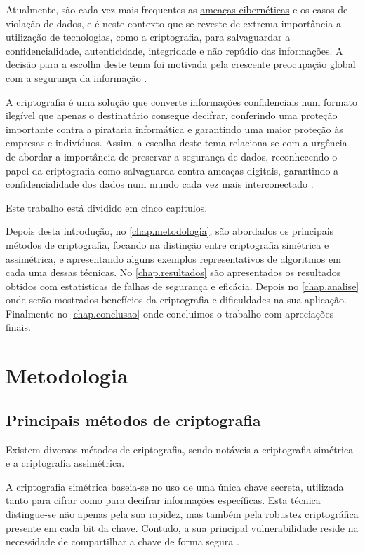 \documentclass{report}
\begin{document}
Atualmente, são cada vez mais frequentes as \underline{ameaças cibernéticas} e os casos de violação de dados, e é neste contexto que se reveste de extrema importância a utilização de tecnologias, como a criptografia, para salvaguardar a confidencialidade, autenticidade, integridade e não repúdio das informações. A decisão para a escolha deste tema foi motivada pela crescente preocupação global com a segurança da informação \cite{Patil.16, Gencoglu.19}. 

A criptografia é uma solução que converte informações confidenciais num formato ilegível que apenas o destinatário consegue decifrar, conferindo uma proteção importante contra a pirataria informática e garantindo uma maior proteção às empresas e indivíduos. Assim, a escolha deste tema relaciona-se com a urgência de abordar a importância de preservar a segurança de dados, reconhecendo o papel da criptografia como salvaguarda contra ameaças digitais, garantindo a confidencialidade dos dados num mundo cada vez mais interconectado \cite{Patil.16, Gencoglu.19}.

Este trabalho está dividido em cinco capítulos.

Depois desta introdução, no \autoref{chap.metodologia}, são abordados os principais métodos de criptografia, focando na distinção entre criptografia simétrica e assimétrica, e apresentando alguns exemplos representativos de algoritmos em cada uma dessas técnicas.
No \autoref{chap.resultados} são apresentados os resultados obtidos com estatísticas de falhas de segurança e eficácia.
Depois no \autoref{chap.analise} onde serão mostrados benefícios da criptografia e dificuldades na sua aplicação.
Finalmente no \autoref{chap.conclusao} onde concluimos o trabalho com apreciações finais.


\chapter{Metodologia}
\label{chap.metodologia}


\section{Principais métodos de criptografia}
Existem diversos métodos de criptografia, sendo notáveis a criptografia simétrica e a criptografia assimétrica.

A criptografia simétrica baseia-se no uso de uma única chave secreta, utilizada tanto para cifrar como para decifrar informações específicas. Esta técnica distingue-se não apenas pela sua rapidez, mas também pela robustez criptográfica presente em cada bit da chave. Contudo, a sua principal vulnerabilidade reside na necessidade de compartilhar a chave de forma segura \cite{Conrad.17}.
\end{document}
